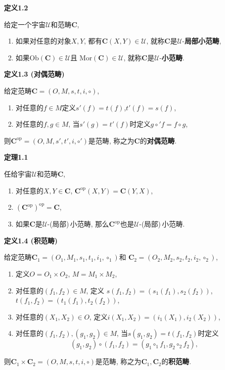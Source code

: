 \documentclass[UTF8]{ctexart}
\begin{document}
\hypertarget{sec:定义1.2}{}
\noindent\textbf{定义1.2}

给定一个宇宙$\mathcal{U}$和范畴$\mathbf{C}$,
\begin{enumerate}
    \item 如果对任意的对象$X,Y$, 都有$\mathbf{C}(X,Y)\in\mathcal{U}$,
    就称$\mathbf{C}$是$\mathcal{U}$-\textbf{局部小范畴},
    \item 如果$\mathrm{Ob}(\mathbf{C})\in\mathcal{U}$且
    $\mathrm{Mor}(\mathbf{C})\in\mathcal{U}$,
    就称$\mathbf{C}$是$\mathcal{U}$-\textbf{小范畴}.
\end{enumerate}

\vspace{10pt}

\hypertarget{sec:定义1.3}{}
\noindent\textbf{定义1.3 (对偶范畴)}

给定范畴$\mathbf{C}=(O,M,s,t,i,\circ)$,
\begin{enumerate}
    \item 对任意的$f\in M$定义$s'(f)=t(f)$,$t'(f)=s(f)$,
    \item 对任意的$f,g\in M$, 当$s'(g)=t'(f)$时定义$g\circ'f=f\circ g$,
\end{enumerate}
则$\mathbf{C}^{\mathrm{op}}=(O,M,s',t',i,\circ')$是范畴,
称之为$\mathbf{C}$的\textbf{对偶范畴}.

\vspace{10pt}

\hypertarget{sec:定理1.1}{}
\noindent\textbf{定理1.1}

任给宇宙$\mathcal{U}$和范畴$\mathbf{C}$,
\begin{enumerate}
    \item 对任意的$X,Y\in\mathbf{C}$,
    $\mathbf{C}^{\mathrm{op}}(X,Y)=\mathbf{C}(Y,X)$,
    \item $(\mathbf{C}^{\mathrm{op}})^{\mathrm{op}}=\mathbf{C}$,
    \item 如果$\mathbf{C}$是$\mathcal{U}$-(局部)\,\!小范畴,
    那么$\mathbf{C}^{\mathrm{op}}$也是$\mathcal{U}$-(局部)\,\!小范畴.
\end{enumerate}





\newpage

\hypertarget{sec:定义1.4}{}
\noindent\textbf{定义1.4 (积范畴)}

给定范畴$\mathbf{C}_1=(O_1,M_1,s_1,t_1,i_1,\circ_1)$和
$\mathbf{C}_2=(O_2,M_2,s_2,t_2,i_2,\circ_2)$,
\begin{enumerate}
    \item 定义$O=O_1\times O_2$, $M=M_1\times M_2$,
    \item 对任意的$(f_1,f_2)\in M$, 定义
    $s(f_1,f_2)=(s_1(f_1),s_2(f_2))$, $t(f_1,f_2)=(t_1(f_1),t_2(f_2))$,
    \item 对任意的$(X_1,X_2)\in O$, 定义$i(X_1,X_2)=(i_1(X_1),i_2(X_2))$,
    \item 对任意的$(f_1,f_2),(g_1,g_2)\in M$, 当$s(g_1,g_2)=t(f_1,f_2)$时定义
    \[
        (g_1,g_2)\circ(f_1,f_2)=(g_1\circ_1f_1,g_2\circ_2f_2),
    \]
\end{enumerate}
则$\mathbf{C}_1\times\mathbf{C}_2=(O,M,s,t,i,\circ)$是范畴,
称之为$\mathbf{C}_1,\mathbf{C}_2$的\textbf{积范畴}.
\end{document}
